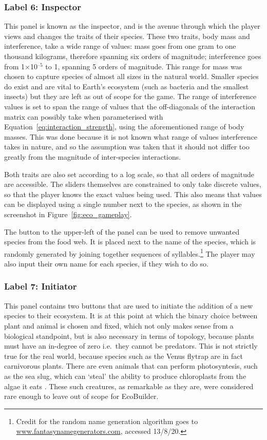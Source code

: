 \subsubsection{Label 6: Inspector}
This panel is known as the inspector, and is the avenue through which the player views and changes the traits of their species.
These two traits, body mass and interference, take a wide range of values: mass goes from one gram to one thousand kilograms, therefore spanning six orders of magnitude; interference goes from 1$\times$10$^{\text{--}5}$ to 1, spanning 5 orders of magnitude. This range for mass was chosen to capture species of almost all sizes in the natural world. Smaller species do exist and are vital to Earth's ecosystem (such as bacteria and the smallest insects) but they are left as out of scope for the game. The range of interference values is set to span the range of values that the off-diagonals of the interaction matrix can possibly take when parameterised with Equation~\ref{eq:interaction_strength}, using the aforementioned range of body masses. This was done because it is not known what range of values interference takes in nature, and so the assumption was taken that it should not differ too greatly from the magnitude of inter-species interactions.

Both traits are also set according to a log scale, so that all orders of magnitude are accessible. The sliders themselves are constrained to only take discrete values, so that the player knows the exact values being used. This also means that values can be displayed using a single number next to the species, as shown in the screenshot in Figure~\ref{fig:eco_gameplay}.

The button to the upper-left of the panel can be used to remove unwanted species from the food web. It is placed next to the name of the species, which is randomly generated by joining together sequences of syllables.\footnote{Credit for the random name generation algorithm goes to \url{www.fantasynamegenerators.com}, accessed 13/8/20.}
The player may also input their own name for each species, if they wish to do so.

\subsubsection{Label 7: Initiator}
This panel contains two buttons that are used to initiate the addition of a new species to their ecosystem.
It is at this point at which the binary choice between plant and animal is chosen and fixed, which not only makes sense from a biological standpoint, but is also necessary in terms of topology, because plants must have an in-degree of zero i.e.\ they cannot be predators. This is not strictly true for the real world, because species such as the Venus flytrap are in fact carnivorous plants. There are even animals that can perform photosyntesis, such as the sea slug, which can `steal' the ability to produce chloroplasts from the algae it eats \cite{Rumpho2008}.
These such creatures, as remarkable as they are, were considered rare enough to leave out of scope for EcoBuilder.

